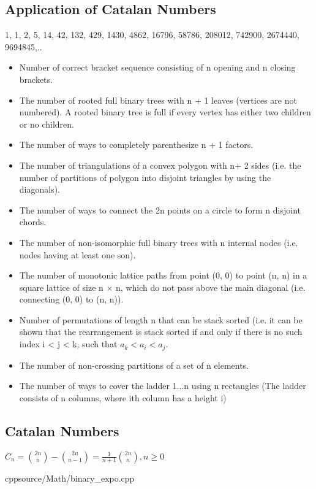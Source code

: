 \documentclass[landscape, 8pt, a4paper, oneside]{extarticle}
\begin{document}
\begin{multicols}{3}
\subsection{Application of Catalan Numbers}
1, 1, 2, 5, 14, 42, 132, 429, 1430, 4862, 16796, 58786, 208012,
742900, 2674440, 9694845,..\\
\begin{itemize}
    \item Number of correct bracket sequence consisting of n opening and n closing brackets.
    \item The number of rooted full binary trees with n + 1
leaves (vertices are not numbered). A rooted binary tree is full if every vertex has either two children or no children.
    \item The number of ways to completely parenthesize n + 1 factors.
    \item The number of triangulations of a convex polygon with n+ 2 sides (i.e. the number of partitions of polygon into disjoint triangles by using the diagonals).
    \item The number of ways to connect the 2n points on a circle to form n disjoint chords.
    \item The number of non-isomorphic full binary trees with n internal nodes (i.e. nodes having at least one son).
    \item The number of monotonic lattice paths from point (0, 0) to point (n, n) in a square lattice of size n × n, which do not pass above the main diagonal (i.e. connecting (0, 0) to (n, n)).
    \item Number of permutations of length n that can be stack sorted (i.e. it can be shown that the rearrangement is stack sorted if and only if there is no such index i < j < k, such that \(a_k < a_i < a_j \).
    \item The number of non-crossing partitions of a set of n elements.
    \item The number of ways to cover the ladder 1...n using n rectangles (The ladder consists of n columns, where ith column has a height i)
\end{itemize}

\subsection{Catalan Numbers}
\(C_n = \binom{2n}{n} - \binom{2n}{n-1} = \frac{1}{n+1}\binom{2n}{n}, n \geq 0\)

{}
{}
{cpp}{source/Math/binary_expo.cpp}


\end{multicols}
\end{document}
